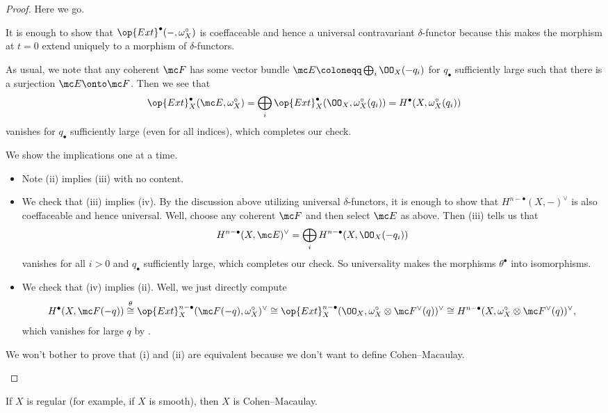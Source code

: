 \documentclass[../notes.tex]{subfiles}
\begin{document}
\begin{proof}
	Here we go.
	\begin{listalph}
		\item It is enough to show that $\op{Ext}^\bullet(-,\omega_X^\circ)$ is coeffaceable and hence a universal contravariant $\delta$-functor because this makes the morphism at $t=0$ extend uniquely to a morphism of $\delta$-functors.
		
		As usual, we note that any coherent $\mc F$ has some vector bundle $\mc E\coloneqq\bigoplus_i\OO_X(-q_i)$ for $q_\bullet$ sufficiently large such that there is a surjection $\mc E\onto\mc F$. Then we see that
		\[\op{Ext}^\bullet_X(\mc E,\omega_X^\circ)=\bigoplus_i\op{Ext}^\bullet_X(\OO_X,\omega_X^\circ(q_i))=H^\bullet(X,\omega_X^\circ(q_i))\]
		vanishes for $q_\bullet$ sufficiently large (even for all indices), which completes our check.

		\item We show the implications one at a time.
		\begin{itemize}
			\item Note (ii) implies (iii) with no content.
			\item We check that (iii) implies (iv). By the discussion above utilizing universal $\delta$-functors, it is enough to show that $H^{n-\bullet}(X,-)^\lor$ is also coeffaceable and hence universal. Well, choose any coherent $\mc F$ and then select $\mc E$ as above. Then (iii) tells us that
			\[H^{n-\bullet}(X,\mc E)^\lor=\bigoplus_iH^{n-\bullet}(X,\OO_X(-q_i))\]
			vanishes for all $i>0$ and $q_\bullet$ sufficiently large, which completes our check. So universality makes the morphisms $\theta^\bullet$ into isomorphisms.
			\item We check that (iv) implies (ii). Well, we just directly compute
			\[H^\bullet(X,\mc F(-q))\stackrel\theta\cong\op{Ext}^{n-\bullet}_X(\mc F(-q),\omega_X^\circ)^\lor\cong\op{Ext}^{n-\bullet}_X(\OO_X,\omega_X^\circ\otimes\mc F^\lor(q))^\lor\cong H^{n-\bullet}(X,\omega_X^\circ\otimes\mc F^\lor(q))^\lor,\]
			which vanishes for large $q$ by .
		\end{itemize}
		We won't bother to prove that (i) and (ii) are equivalent because we don't want to define Cohen--Macaulay.
		\qedhere
	\end{listalph}
\end{proof}
\begin{remark}
	If $X$ is regular (for example, if $X$ is smooth), then $X$ is Cohen--Macaulay.
\end{remark}
\end{document}
